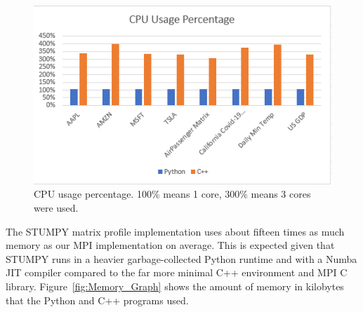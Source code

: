 \documentclass[conference]{IEEEtran}
\begin{document}
\begin{figure}
\begin{center}
\includegraphics[scale=1.05]{CPU.png}
\caption{CPU usage percentage. 100\% means 1 core, 300\% means 3 cores were used.}
\label{fig:CPU_Graph}
\end{center}
\end{figure}
The STUMPY matrix profile implementation uses about fifteen times as much memory as our MPI implementation on average.  This is expected given that STUMPY runs in a heavier garbage-collected Python runtime and with a Numba JIT compiler compared to the far more minimal C++ environment and MPI C library. Figure~\ref{fig:Memory_Graph} shows the amount of memory in kilobytes that the Python and C++ programs used.
\end{document}
